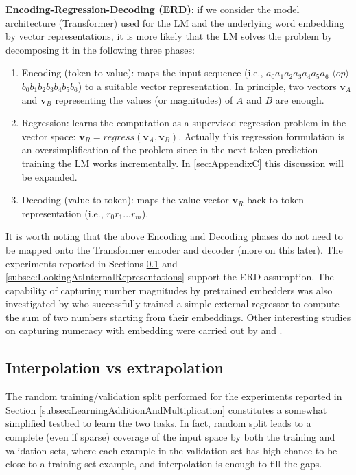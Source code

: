 \documentclass[final,1p,times,authoryear]{elsarticle}
\begin{document}
\textbf{Encoding-Regression-Decoding (ERD)}: if we consider the model architecture (Transformer) used for the LM and the underlying word embedding by vector representations, it is more likely that the LM solves the problem by decomposing it in the following three phases:

\begin{enumerate}
\item Encoding (token to value): maps the input sequence (i.e., $a_0 a_1 a_2 a_3 a_4 a_5 a_6$ $\langle op \rangle$ $b_0 b_1 b_2 b_3 b_4 b_5 b_6$) to a suitable vector representation. In principle, two vectors $\textbf{v}_A$ and $\textbf{v}_B$ representing the values (or magnitudes) of $A$ and $B$ are enough.
\item Regression: learns the computation as a supervised regression problem in the vector space: $\textbf{v}_R=regress(\textbf{v}_A,\textbf{v}_B)$. Actually this regression formulation is an oversimplification of the problem since in the next-token-prediction training the LM works incrementally. In \ref{sec:AppendixC} this discussion will be expanded. 
\item Decoding (value to token): maps the value vector $\textbf{v}_R$ back to token representation (i.e., $r_0  r_1...r_m$).
\end{enumerate}

It is worth noting that the above Encoding and Decoding phases do not need to be mapped onto the Transformer encoder and decoder (more on this later). The experiments reported in Sections \ref{subsec:InterpolationVsExtrapolation} and \ref{subsec:LookingAtInternalRepresentations} support the ERD assumption. The capability of capturing number magnitudes by pretrained embedders was also investigated by \citet{Wallace2019} who successfully trained a simple external regressor to compute the sum of two numbers starting from their embeddings. Other interesting studies on capturing numeracy with embedding were carried out by \citet{Naik2019} and \citet{Sundararaman2020}.

\subsection{Interpolation vs extrapolation} \label{subsec:InterpolationVsExtrapolation}

The random training/validation split performed for the experiments reported in Section \ref{subsec:LearningAdditionAndMultiplication} constitutes a somewhat simplified testbed to learn the two tasks. In fact, random split leads to a complete (even if sparse) coverage of the input space by both the training and validation sets, where each example in the validation set has high chance to be close to a training set example, and interpolation is enough to fill the gaps.
\end{document}

